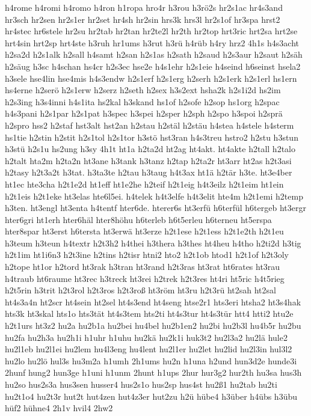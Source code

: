 {h4rome
h4romi
h4romo
h4ron
h1ropa
hro4r
h3rou
h3rö2s
hr2s1ac
hr4s3and
hr3sch
hr2sen
hr2s1er
hr2set
hr4sh
hr2sin
hrs3k
hrs3l
hr2s1of
hr3spa
hrst2
hr4stec
hr6stele
hr2su
hr2tab
hr2tan
hr2te2l
hr2th
hr2top
hrt3ric
hrt2sa
hrt2se
hrt4sin
hrt2sp
hrt4ste
h3ruh
hr1ums
h3rut
h3rü
h4rüb
h4ry
hrz2
4h1s
h4s3acht
h2sa2d
h2s1alk
h2sall
h4samt
h2san
h2s1as
h2sath
h2saud
h2s3aur
h2saut
h2säh
h2säug
h3sc
h4schan
hs4cr
h2s3ec
hse2e
h4s1ehr
h2s1eie
h4seind
h6seinst
hsela2
h3sele
hse4lin
hse4mis
h4s3endw
h2s1erf
h2s1erg
h2serh
h2s1erk
h2s1erl
hs1ern
hs4erne
h2serö
h2s1erw
h2serz
h2seth
h2sex
h3s2ext
hsha2k
h2s1i2d
hs2im
h2s3ing
h3s4inni
h4s1ita
hs2kal
h3skand
hs1of
h2sofe
h2sop
hs1org
h2spac
h4s3pani
h2s1par
h2s1pat
h3spec
h3spei
h2sper
h2sph
h2spo
h3spoi
h2sprä
h2spro
hss2
h2staf
hst3alt
hst2an
h2stau
h2stäl
h2stäu
h4stea
h4stele
h4sterm
hs1tie
h2stin
h2stit
h2s1tol
h2s1tor
h3stö
hst3ran
h4s3treu
hstro2
h2stu
h3stun
h3stü
h2s1u
hs2ung
h3sy
4h1t
ht1a
h2ta2d
ht2ag
ht4akt.
ht4akte
h2tall
h2talo
h2talt
hta2m
h2ta2n
ht3ane
h3tank
h3tanz
h2tap
h2ta2r
ht3arr
ht2as
h2t3asi
h2tasy
h2t3a2t
h3tat.
h3ta3te
h2tau
h3taug
h4t3ax
ht1ä
h2tär
h3te.
ht3e4ber
ht1ec
hte3cha
h2t1e2d
ht1eff
ht1e2he
h2teif
h2t1eig
h4t3eilz
h2t1eim
ht1ein
h2t1eis
h2t1eke
ht3elas
hte6l5ei.
h4telek
h4t3elfe
h4t3elit
hte4m
h2t1emi
h2temp
h3ten.
ht3engl
ht3enta
h4tentf
hter6de.
hterer6s
ht3erfü
h6terfül
h6tergeb
ht3ergr
hter6gri
ht1erh
hter6häl
hter8höhu
h6terleb
h6t5erleu
h6terneu
ht5erspa
hter8spar
ht3erst
h6tersta
ht3erwä
ht3erze
h2t1ese
h2t1ess
h2t1e2th
h2t1eu
h3teum
h3teun
h4textr
h2t3h2
h4thei
h3thera
h3thes
ht4heu
h4tho
h2ti2d
h3tig
h2t1im
ht1i6n3
h2t3ine
h2tins
h2tisr
htni2
hto2
h2t1ob
htod1
h2t1of
h2t3oly
h2tope
ht1or
h2tord
ht3rak
h3tran
ht3rand
h2t3ras
ht3rat
ht6rates
ht3rau
h4traub
ht6raume
ht3rec
h3treck
ht3rei
h2trek
h2t3res
ht4ri
ht5ric
h4t5rieg
h2t5rin
h3trit
h2t3rol
h2t3ros
h2t3roß
ht3röm
ht3ru
h2t3rü
ht2sah
ht2sal
ht4s3a4n
ht2scr
ht4sein
ht2sel
ht4s3end
ht4seng
htse2r1
hts3eri
htsha2
ht3s4hak
hts3k
ht3skal
hts1o
hts3tät
ht4s3tem
hts2ti
ht4s3tur
ht4s3tür
htt4
htti2
htu2e
h2t1urs
ht3z2
hu2a
hu2b1a
hu2bei
hu4bel
hu2b1en2
hu2bi
hu2b3l
hu4b5r
hu2bu
hu2fa
hu2h3a
hu2h1i
h1uhr
h1uhu
hu2kä
hu2k1i
huk3t2
hu2l3a2
hu2lä
hule2
hu2l1eb
hu2l1ei
hu2lem
hu4l3eng
hu4lent
hu2l1er
hu2let
hu2lid
hu2l3in
hul3l2
hu2lo
hu2lö
hul3s
hu3m2a
h1umh
2h1ums
hu2n
h1una
h2und
hun3d2e
hunde3i
2hunf
hung2
hun3ge
h1uni
h1unm
2hunt
h1ups
2hur
hur3g2
hur2th
hu3sa
hus3h
hu2so
hus2s3a
hus3sen
husser4
hus2s1o
hus2sp
hus4st
hu2ß1
hu2tab
hu2ti
hu2t1o4
hu2t3r
hut2t
hut4zen
hut4z3er
hut2zu
h2ü
hübe4
h3über
h4übs
h3übu
hüf2
hühne4
2h1v
hvil4
2hw2
}
